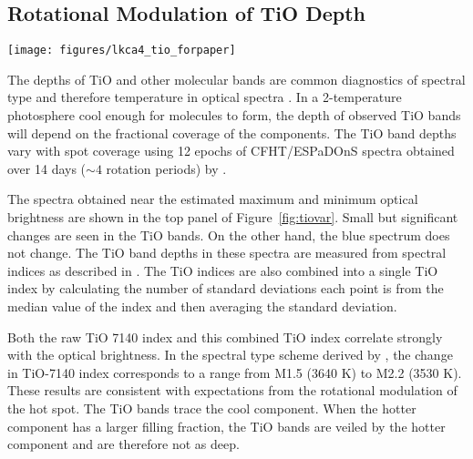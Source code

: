 \documentclass[twocolumn]{emulateapj}%
\begin{document}
\subsection{Rotational Modulation of TiO Depth}\label{sec:RotTiO}

\begin{figure*}
 \centering
 \texttt{[image: figures/lkca4\_tio\_forpaper]}
 \caption{Variability in TiO bands measured with ESPaDOnS.  The $V-$band emission is estimated from fits to the ASAS-SN lightcurve obtained during the same period.  The bottom left panel shows a correlation between $V-$band magnitude and the TiO-7140 index, while the bottom right shows a similar correlation with the average of the TiO 6200, CaH 6800, and TiO 7600 indices.}
 \label{fig:tiovar}
\end{figure*}

The depths of TiO and other molecular bands are common diagnostics of spectral type and therefore temperature in optical spectra \citep[e.g.][]{kirkpatrick91}.  In a 2-temperature photosphere cool enough for molecules to form, the depth of observed TiO bands will depend on the fractional coverage of the components.  The TiO band depths vary with spot coverage using 12 epochs of CFHT/ESPaDOnS spectra obtained over 14 days ($\sim 4$ rotation periods) by \citet{donati14}.

The spectra obtained near the estimated maximum and minimum optical brightness are shown in the top panel of Figure~\ref{fig:tiovar}.  Small but significant changes are seen in the TiO bands.  On the other hand, the blue spectrum does not change.  The TiO band depths in these spectra are measured from spectral indices as described in \citet{herczeg14}.  The TiO indices are also combined into a single TiO index by calculating the number of standard deviations each point is from the median value of the index and then averaging the standard deviation.  

Both the raw TiO 7140 index and this combined TiO index correlate strongly with the optical brightness.  In the spectral type scheme derived by \citet{herczeg14}, the change in TiO-7140 index corresponds to a range from M1.5 (3640 K) to M2.2 (3530 K).  These results are consistent with expectations from the rotational modulation of the hot spot.  The TiO bands trace the cool component.  When the hotter component has a larger filling fraction, the TiO bands are veiled by the hotter component and are therefore not as deep.
\end{document}
